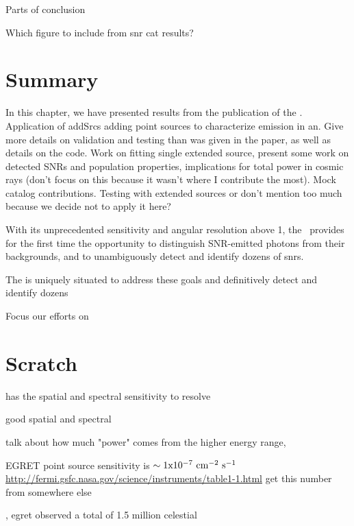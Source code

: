{Parts of conclusion

Which figure to include from snr cat results?


\section{Summary}\label{snrCat:summ}
In this chapter, we have presented results from the publication of the \snrcat. Application of addSrcs adding point sources to characterize emission in an\roi. Give more details on validation and testing than was given in the paper, as well as details on the code. Work on fitting single extended source, present some work on detected SNRs and population properties, implications for total power in cosmic rays (don't focus on this because it wasn't where I contribute the most). Mock catalog contributions. Testing with extended sources or don't mention too much because we decide not to apply it here?

With its unprecedented sensitivity and angular resolution above 1\gev, the \lat~provides for the first time the opportunity to distinguish SNR-emitted photons from their backgrounds, and  to unambiguously detect and identify dozens of \glspl{snr}. 

The \lat{} is uniquely situated to address these goals and definitively detect and identify dozens \snrs

Focus our efforts on
\section{Scratch}
has the spatial and spectral sensitivity to resolve

good spatial and spectral 


talk about how much "power" comes from the higher energy  range,

EGRET point source sensitivity is ${\rm \sim1x10^{-7}}~\mathrm{cm^{-2}~s^{-1}}{}$
 \url{http://fermi.gsfc.nasa.gov/science/instruments/table1-1.html} get this number from somewhere else



\cite{Thomson93}, egret observed a total of 1.5 million celestial \gam{}


}
